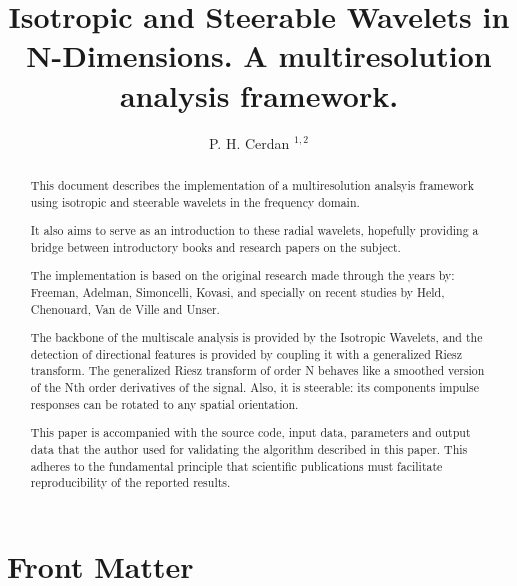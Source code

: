 \documentclass{InsightArticle}
\title{Isotropic and Steerable Wavelets in N-Dimensions. A multiresolution analysis framework.}
\author{P. H. Cerdan $^{1,2}$}
\theoremstyle{definition}
\newcommand{\IJhandlerIDnumber}{3558}
\begin{document}
%
%
\IJhandlefooter{\IJhandlerIDnumber}


\ifpdf
\else
\fi


\maketitle


\ifhtml
\chapter*{Front Matter\label{front}}
\fi

\begin{abstract}
\noindent
This document describes the implementation of a multiresolution analsyis framework using isotropic and steerable wavelets in the frequency domain.

It also aims to serve as an introduction to these radial wavelets, hopefully providing a bridge between introductory books and research papers on the subject.

The implementation is based on the original research made through the years by: Freeman, Adelman, Simoncelli, Kovasi, and specially on recent studies by Held, Chenouard, Van de Ville and Unser.

The backbone of the multiscale analysis is provided by the Isotropic Wavelets, and the detection of directional features is provided by coupling it with a generalized Riesz transform.
The generalized Riesz transform of order N behaves like a smoothed version of the Nth order derivatives of the signal. Also, it is steerable: its components impulse responses can be rotated to any spatial orientation.

This paper is accompanied with the source code, input data, parameters and
output data that the author used for validating the algorithm described in
this paper. This adheres to the fundamental principle that scientific
publications must facilitate reproducibility of the reported results.

\end{abstract}
\end{document}
